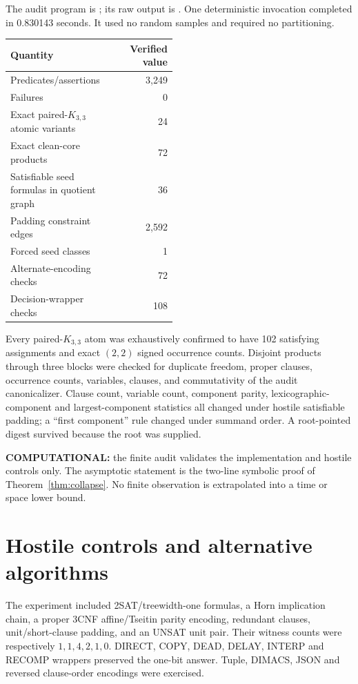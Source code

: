 \documentclass[11pt]{article}
\begin{document}
The audit program is
; its
raw output is
.
One deterministic invocation completed in 0.830143 seconds.  It used no
random samples and required no partitioning.

\begin{center}
\begin{tabular}{@{}p{0.48\linewidth}r@{}}
\toprule
Quantity & Verified value\\
\midrule
Predicates/assertions & 3,249\\
Failures & 0\\
Exact paired-\(K_{3,3}\) atomic variants & 24\\
Exact clean-core products & 72\\
Satisfiable seed formulas in quotient graph & 36\\
Padding constraint edges & 2,592\\
Forced seed classes & 1\\
Alternate-encoding checks & 72\\
Decision-wrapper checks & 108\\
\bottomrule
\end{tabular}
\end{center}

Every paired-\(K_{3,3}\) atom was exhaustively confirmed to have 102
satisfying assignments and exact \((2,2)\) signed occurrence counts.
Disjoint products through three blocks were checked for duplicate freedom,
proper clauses, occurrence counts, variables, clauses, and commutativity of
the audit canonicalizer.  Clause count, variable count, component parity,
lexicographic-component and largest-component statistics all changed under
hostile satisfiable padding; a ``first component'' rule changed under summand
order.  A root-pointed digest survived because the root was supplied.

\textbf{COMPUTATIONAL:} the finite audit validates the implementation and
hostile controls only.  The asymptotic statement is the two-line symbolic
proof of Theorem~\ref{thm:collapse}.  No finite observation is extrapolated
into a time or space lower bound.

\section{Hostile controls and alternative algorithms}

The experiment included 2SAT/treewidth-one formulas, a Horn implication
chain, a proper 3CNF affine/Tseitin parity encoding, redundant clauses,
unit/short-clause padding, and an UNSAT unit pair.  Their witness counts were
respectively \(1,1,4,2,1,0\).  DIRECT, COPY, DEAD, DELAY, INTERP and RECOMP
wrappers preserved the one-bit answer.  Tuple, DIMACS, JSON and reversed
clause-order encodings were exercised.
\end{document}

